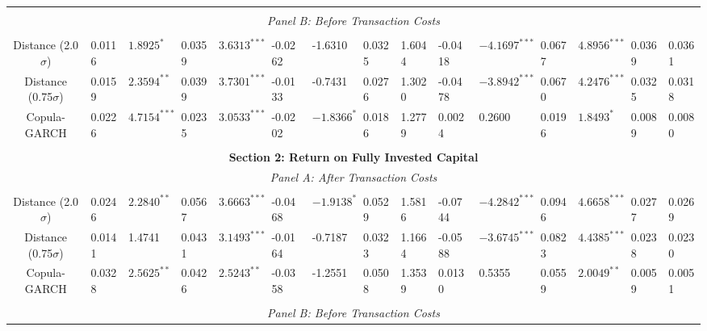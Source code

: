 \documentclass[a4paper]{article}
\begin{document}
\begin{sidewaystable}
\begin{threeparttable}[H]
\begin{tabularx}{\textwidth}{@{\extracolsep{\fill}}lllllllllllllll@{}}
				&       &       &       &       &       &       &       &       &       &       &       &       &       &  \\
				\multicolumn{15}{c}{\textit{Panel B: Before Transaction Costs}} \\
				&       &       &       &       &       &       &       &       &       &       &       &       &       &  \\
				\multicolumn{1}{c}{Distance (2.0$\sigma$)}& 0.0116 & $1.8925^{*}$ & 0.0359 & $3.6313^{***}$ & -0.0262 & -1.6310 & 0.0325 & 1.6044 & -0.0418 & $-4.1697^{***}$ & 0.0677 & $4.8956^{***}$ & 0.0369 & 0.0361 \\
				\multicolumn{1}{c}{Distance (0.75$\sigma$)} & 0.0159 & $2.3594^{**}$ & 0.0399 & $3.7301^{***}$ & -0.0133 & -0.7431 & 0.0276 & 1.3020 & -0.0478 & $-3.8942^{***}$ & 0.0670 & $4.2476^{***}$ & 0.0325 & 0.0318 \\
				\multicolumn{1}{c}{Copula-GARCH} & 0.0226 & $4.7154^{***}$ & 0.0235 & $3.0533^{***}$ & -0.0202 & $-1.8366^{*}$ & 0.0186 & 1.2779 & 0.0024 & 0.2600 & 0.0196 & $1.8493^{*}$ & 0.0089 & 0.0080  \\
				&       &       &       &       &       &       &       &       &       &       &       &       &       &  \\
				\midrule
				\multicolumn{15}{c}{\textbf{Section 2: Return on Fully Invested Capital}} \\
				\multicolumn{15}{c}{\textit{Panel A: After Transaction Costs}} \\
				&       &       &       &       &       &       &       &       &       &       &       &       &       &  \\
				\multicolumn{1}{c}{Distance (2.0$\sigma$)} & 0.0246 & $2.2840^{**}$ & 0.0567 & $3.6663^{***}$ & -0.0468 & $-1.9138^{*}$ & 0.0529 & 1.5816 & -0.0744 & $-4.2842^{***}$ & 0.0946 & $4.6658^{***}$ & 0.0277 & 0.0269\\
				\multicolumn{1}{c}{Distance (0.75$\sigma$)} & 0.0141 & 1.4741 & 0.0431 & $3.1493^{***}$ & -0.0164 & -0.7187 & 0.0323 & 1.1664 & -0.0588 & $-3.6745^{***}$ & 0.0823 & $4.4385^{***}$ & 0.0238 & 0.0230 \\
				\multicolumn{1}{c}{Copula-GARCH} & 0.0328 & $2.5625^{**}$ & 0.0426 & $2.5243^{**}$ & -0.0358 & -1.2551 & 0.0508 & 1.3539 & 0.0130 & 0.5355 & 0.0559 & $2.0049^{**}$ & 0.0059 & 0.0051  \\
				&       &       &       &       &       &       &       &       &       &       &       &       &       &  \\
				\multicolumn{15}{c}{\textit{Panel B: Before Transaction Costs}} \\

\end{tabularx}
\end{threeparttable}
\end{sidewaystable}
\end{document}
